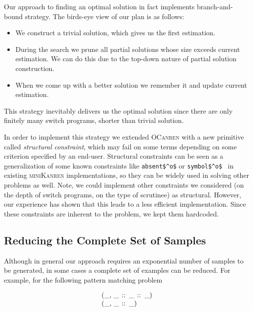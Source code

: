 Our approach to finding an optimal solution in fact implements branch-and-bound strategy. The birds-eye view of our plan is as follows:

\begin{itemize}
\item We construct a trivial solution, which gives us the first estimation.
\item During the search we prune all partial solutions whose size exceeds current estimation. We can do this due to
  the top-down nature of partial solution construction.
\item When we come up with a better solution we remember it and update current estimation.
\end{itemize}

\noindent This strategy inevitably delivers us the optimal solution since there are only finitely many switch programs, shorter than trivial solution.

In order to implement this strategy we extended \textsc{OCanren} with a new primitive called \emph{structural constraint}, which may
fail on some terms depending on some criterion specified by an end-user. Structural constraints can be seen as a generalization of
some known constraints like \lstinline|absent$^o$| or \lstinline|symbol$^o$|~\cite{Untagged} in existing \textsc{miniKanren} implementations, 
so they can be widely used in solving other problems as well. Note, we could implement other constraints we considered (on the
depth of switch programs, on the type of scrutinee) as structural.
However, our experience has shown that this leads to
a less efficient implementation. Since these constraints are inherent to the problem, we kept them hardcoded.

\subsection{Reducing the Complete Set of Samples}
\label{sec:reduced-samples}

Although in general our approach requires an exponential number of samples to be generated, in some cases a complete set of examples can be reduced.
For example, for the following pattern matching problem

\[
\begin{array}{l}
\mbox{\lstinline|(_, _ :: _ :: _)|} \\
\mbox{\lstinline|(_, _ :: _)|}
\end{array}
\]

